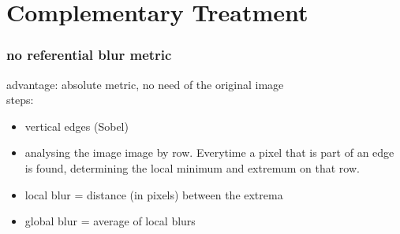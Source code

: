 \section[Compl. Treatment]{Complementary Treatment}
\begin{frame}
  \frametitle{no referential blur metric}
  
  advantage: absolute metric, no need of the original image\\
  steps:
  \begin{itemize}
  \item vertical edges (Sobel)
  \item analysing the image image by row. Everytime a pixel that is part of an edge is found, determining the local minimum and extremum on that row.
  \item local blur = distance (in pixels) between the extrema
  \item global blur = average of local blurs
  \end{itemize}
\end{frame}